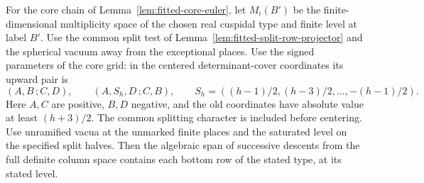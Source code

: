 \begin{auxlemma}\label{lem:fitted-core-span}
For the core chain of Lemma~\ref{lem:fitted-core-euler}, let
\(M_i(B')\) be the finite-dimensional multiplicity space of the
chosen real cuspidal type and finite level at label \(B'\).
Use the common split test of Lemma~\ref{lem:fitted-split-row-projector}
and the spherical vacuum away from the exceptional places.
Use the signed parameters of the core grid: in the centered
determinant-cover coordinates its upward pair is
\[
 (A,B\,;C,D),\qquad (A,S_h,D\,;C,B),\qquad
 S_h=((h-1)/2,(h-3)/2,\ldots,-(h-1)/2).
\]
Here \(A,C\) are positive, \(B,D\) negative, and the old coordinates
have absolute value at least \((h+3)/2\). The common splitting
character is included before centering. Use unramified vacua
at the unmarked finite places and the saturated level on the
specified split halves. Then the algebraic span of successive
descents from the full definite column space contains each bottom
row of the stated type, at its stated level.
\end{auxlemma}
